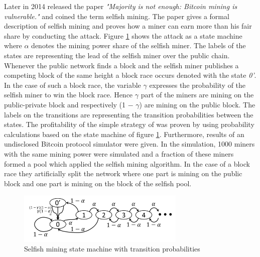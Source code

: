 \documentclass{scrartcl}
\begin{document}
Later in 2014 \citeauthor{eyal2014majority} released the paper \textit{"Majority is not enough: Bitcoin mining is vulnerable."} and coined the term selfish mining.
The paper gives a formal description of selfish mining and proves how a miner can earn more than his fair share by conducting the attack.
Figure \ref{fig:selfish_mining} shows the attack as a state machine where $\alpha$ denotes the mining power share of the selfish miner.
The labels of the states are representing the lead of the selfish miner over the public chain.
Whenever the public network finds a block and the selfish miner publishes a competing block of the same height a block race occurs denoted with the state \textit{0'}.
In the case of such a block race, the variable $\gamma$ expresses the probability of the selfish miner to win the block race.
Hence $\gamma$ part of the miners are mining on the public-private block and respectively (1 − $\gamma$) are mining on the public block.
The labels on the transitions are representing the transition probabilities between the states.
The profitability of the simple strategy of \cite{eyal2014majority} was proven by using probability calculations based on the state machine of figure \ref{fig:selfish_mining}.
Furthermore, results of an undisclosed Bitcoin protocol simulator were given.
In the simulation, 1000 miners with the same mining power were simulated and a fraction of these miners formed a pool which applied the selfish mining algorithm.
In the case of a block race they artificially split the network where one part is mining on the public block and one part is mining on the block of the selfish pool.


\begin{figure}[t]
\includegraphics[width=8cm]{figures/selfish_mining}
\centering
\caption{Selfish mining state machine with transition probabilities \cite{eyal2014majority}}
\label{fig:selfish_mining}
\end{figure}
\end{document}
